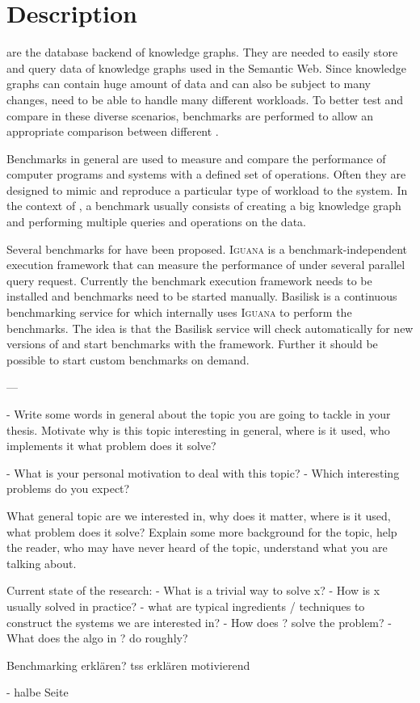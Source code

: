 \chapter{Description}
\label{ch:description}

\tsp{} are the database backend of knowledge graphs. 
They are needed to easily store and query data of knowledge graphs used in the Semantic Web.
Since knowledge graphs can contain huge amount of data and can also be subject to many changes, \tsp{} need to be able to handle many different workloads.
To better test and compare \tsp{} in these diverse scenarios, benchmarks are performed to allow an appropriate comparison between different \tsp{}.

Benchmarks in general are used to measure and compare the performance of computer programs and systems with a defined set of operations.
Often they are designed to mimic and reproduce a particular type of workload to the system.
In the context of \tsp{}, a benchmark usually consists of creating a big knowledge graph and performing multiple queries and operations on the data.

Several benchmarks for \tsp{} have been proposed.
\textsc{Iguana} is a benchmark-independent execution framework \cite{IGUANA} that can measure the performance of \tsp{} under several parallel query request.
Currently the benchmark execution framework needs to be installed and benchmarks need to be started manually.
Basilisk is a continuous benchmarking service for \tsp{} which internally uses \textsc{Iguana} to perform the benchmarks.
The idea is that the Basilisk service will check automatically for new versions of \tsp{} and start benchmarks with the \iguana{} framework.
Further it should be possible to start custom benchmarks on demand.



---

- Write some words in general about the topic you are going to tackle in your thesis. Motivate why is this topic interesting in general, where is it used, who implements it what problem does it solve?

- What is your personal motivation to deal with this topic?
- Which interesting problems do you expect?

What general topic are we interested in, why does it matter, where is it used, what problem does it solve?
Explain some more background for the topic, help the reader, who may have never heard of the topic, understand what you are talking about.

Current state of the research:
- What is a trivial way to solve x?
- How is x usually solved in practice?
- what are typical ingredients / techniques to construct the systems we are interested in?
- How does ? solve the problem?
- What does the algo in ? do roughly?


Benchmarking erklären?
\aclp*{ts} erklären motivierend


- halbe Seite

